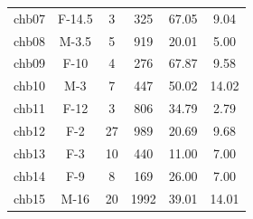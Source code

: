 \begin{table}[ht]
{\begin{tabular}{cccccc}
        chb07   & F-14.5     & 3        & 325                                                                    & 67.05                                                          & 9.04                                                                                  \\
        chb08   & M-3.5      & 5        & 919                                                                    & 20.01                                                          & 5.00                                                                                  \\
        chb09   & F-10       & 4        & 276                                                                    & 67.87                                                          & 9.58                                                                                  \\
        chb10   & M-3        & 7        & 447                                                                    & 50.02                                                          & 14.02                                                                                 \\
        chb11   & F-12       & 3        & 806                                                                    & 34.79                                                          & 2.79                                                                                  \\
        chb12   & F-2        & 27       & 989                                                                    & 20.69                                                          & 9.68                                                                                  \\
        chb13   & F-3        & 10       & 440                                                                    & 11.00                                                          & 7.00                                                                                  \\
        chb14   & F-9        & 8        & 169                                                                    & 26.00                                                          & 7.00                                                                                  \\
        chb15   & M-16       & 20       & 1992                                                                   & 39.01                                                          & 14.01                                                                                 \\

\end{tabular}}
\end{table}
